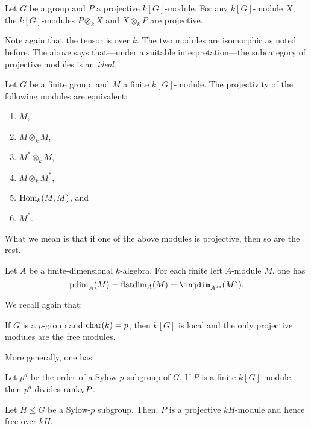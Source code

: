 \documentclass[12pt]{article}
\begin{document}
\begin{thm}
	Let $G$ be a group and $P$ a projective $k[G]$-module. 
	For any $k[G]$-module $X$, the $k[G]$-modules $P \otimes_{k} X$ and $X \otimes_{k} P$ are projective.
\end{thm}
Note again that the tensor is over $k$. 
The two modules are isomorphic as noted before. 
The above says that---under a suitable interpretation---the subcategory of projective modules is an \emph{ideal}.

\begin{thm}
	Let $G$ be a finite group, and $M$ a finite $k[G]$-module. 
	The projectivity of the following modules are equivalent:
	\begin{enumerate}[label=(\alph*)]
		\item $M$,
		\item $M \otimes_{k} M$,
		\item $M^{\ast} \otimes_{k} M$,
		\item $M \otimes_{k} M^{\ast}$,
		\item $\operatorname{Hom}_{k}(M, M)$, and
		\item $M^{\ast}$.
	\end{enumerate}
\end{thm}
What we mean is that if one of the above modules is projective, then so are the rest.

\begin{thm}
	Let $A$ be a finite-dimensional $k$-algebra. 
	For each finite left $A$-module $M$, one has
	\begin{equation*} 
		\pdim_{A}(M) = \operatorname{flatdim}_{A}(M) = \injdim_{A^{\op}}(M^{\ast}).
	\end{equation*}
\end{thm}

We recall again that:
\begin{thm}
	If $G$ is a $p$-group and $\operatorname{char}(k) = p$, then $k[G]$ is local and the only projective modules are the free modules.
\end{thm}

More generally, one has:
\begin{thm}
	Let $p^{d}$ be the order of a Sylow-$p$ subgroup of $G$. 
	If $P$ is a finite $k[G]$-module, then 
	$p^{d}$ divides $\operatorname{rank}_{k} P$.
\end{thm}
\begin{sketch}
	Let $H \le G$ be a Sylow-$p$ subgroup. 
	Then, $P$ is a projective $kH$-module and hence free over $kH$.
\end{sketch}
\end{document}
